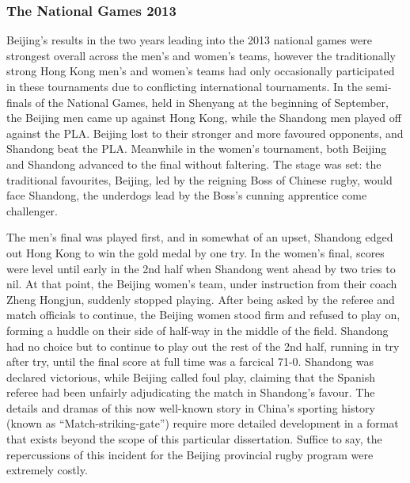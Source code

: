 \begin{CJK}{UTF8}{gbsn}
\subsubsection{The National Games 2013}
Beijing's results in the two years leading into the 2013 national games were strongest overall across the men's and women's teams, however the traditionally strong Hong Kong men's and women's teams had only occasionally participated in these tournaments due to conflicting international tournaments.  In the semi-finals of the National Games, held in Shenyang at the beginning of September, the Beijing men came up against Hong Kong, while the Shandong men played off against the PLA.  Beijing lost to their stronger and more favoured opponents, and Shandong beat the PLA.  Meanwhile in the women's tournament, both Beijing and Shandong advanced to the final without faltering.  The stage was set: the traditional favourites, Beijing, led by the reigning Boss of Chinese rugby, would face Shandong, the underdogs lead by the Boss's cunning apprentice come challenger.

The men's final was played first, and in somewhat of an upset, Shandong edged out Hong Kong to win the gold medal by one try.  In the women's final, scores were level until early in the 2nd half when Shandong went ahead by two tries to nil.  At that point, the Beijing women's team, under instruction from their coach Zheng Hongjun, suddenly stopped playing.  After being asked by the referee and match officials to continue, the Beijing women stood firm and refused to play on, forming a huddle on their side of half-way in the middle of the field. Shandong had no choice but to continue to play out the rest of the 2nd half, running in try after try, until the final score at full time was a farcical 71-0.  Shandong was declared victorious, while Beijing called foul play, claiming that the Spanish referee had been unfairly adjudicating the match in Shandong's favour.  The details and dramas of this now well-known story in China's sporting history (known as ``Match-striking-gate'') require more detailed development in a format that exists beyond the scope of this particular dissertation. Suffice to say, the repercussions of this incident for the Beijing provincial rugby program were extremely costly.





\end{CJK}
